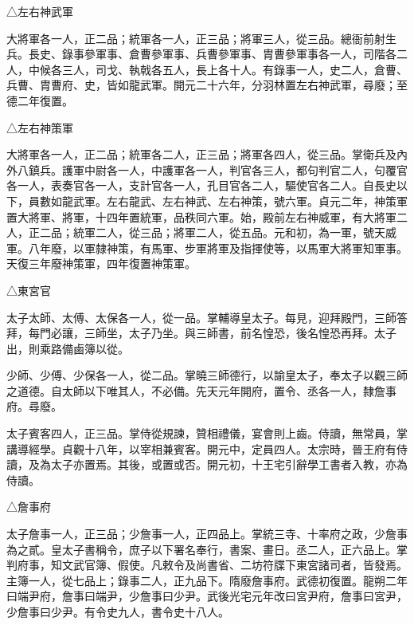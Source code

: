 \begin{pinyinscope}
 △左右神武軍



 大將軍各一人，正二品；統軍各一人，正三品；將軍三人，從三品。總衙前射生兵。長史、錄事參軍事、倉曹參軍事、兵曹參軍事、胄曹參軍事各一人，司階各二人，中候各三人，司戈、執戟各五人，長上各十人。有錄事一人，史二人，倉曹、兵曹、胄曹府、史，皆如龍武軍。開元二十六年，分羽林置左右神武軍，尋廢；至德二年復置。



 △左右神策軍



 大將軍各一人，正二品；統軍各二人，正三品；將軍各四人，從三品。掌衛兵及內外八鎮兵。護軍中尉各一人，中護軍各一人，判官各三人，都句判官二人，句覆官各一人，表奏官各一人，支計官各一人，孔目官各二人，驅使官各二人。自長史以下，員數如龍武軍。左右龍武、左右神武、左右神策，號六軍。貞元二年，神策軍置大將軍、將軍，十四年置統軍，品秩同六軍。始，殿前左右神威軍，有大將軍二人，正二品；統軍二人，從三品；將軍二人，從五品。元和初，為一軍，號天威軍。八年廢，以軍隸神策，有馬軍、步軍將軍及指揮使等，以馬軍大將軍知軍事。天復三年廢神策軍，四年復置神策軍。



 △東宮官



 太子太師、太傅、太保各一人，從一品。掌輔導皇太子。每見，迎拜殿門，三師答拜，每門必讓，三師坐，太子乃坐。與三師書，前名惶恐，後名惶恐再拜。太子出，則乘路備鹵簿以從。



 少師、少傅、少保各一人，從二品。掌曉三師德行，以諭皇太子，奉太子以觀三師之道德。自太師以下唯其人，不必備。先天元年開府，置令、丞各一人，隸詹事府。尋廢。



 太子賓客四人，正三品。掌侍從規諫，贊相禮儀，宴會則上齒。侍讀，無常員，掌講導經學。貞觀十八年，以宰相兼賓客。開元中，定員四人。太宗時，晉王府有侍讀，及為太子亦置焉。其後，或置或否。開元初，十王宅引辭學工書者入教，亦為侍讀。



 △詹事府



 太子詹事一人，正三品；少詹事一人，正四品上。掌統三寺、十率府之政，少詹事為之貳。皇太子書稱令，庶子以下署名奉行，書案、畫日。丞二人，正六品上。掌判府事，知文武官簿、假使。凡敕令及尚書省、二坊符牒下東宮諸司者，皆發焉。主簿一人，從七品上；錄事二人，正九品下。隋廢詹事府。武德初復置。龍朔二年曰端尹府，詹事曰端尹，少詹事曰少尹。武後光宅元年改曰宮尹府，詹事曰宮尹，少詹事曰少尹。有令史九人，書令史十八人。




\end{pinyinscope}
